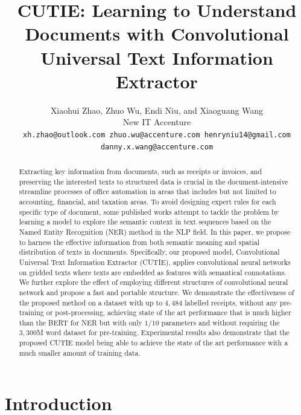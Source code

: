 \documentclass[10pt,twocolumn,letterpaper]{article}
\begin{document}
\title{CUTIE: Learning to Understand Documents with Convolutional Universal Text Information Extractor}

\author{
  Xiaohui Zhao, Zhuo Wu, Endi Niu, and Xiaoguang Wang \\
  New IT Accenture \\
{\tt\small xh.zhao@outlook.com zhuo.wu@accenture.com henryniu14@gmail.com danny.x.wang@accenture.com}
}

\maketitle

\begin{abstract}
   Extracting key information from documents, such as receipts or invoices, and preserving the interested texts to structured data is crucial in the document-intensive streamline processes of office automation in areas that includes but not limited to accounting, financial, and taxation areas. To avoid designing expert rules for each specific type of document, some published works attempt to tackle the problem by learning a model to explore the semantic context in text sequences based on the Named Entity Recognition (NER) method in the NLP field. In this paper, we propose to harness the effective information from both semantic meaning and spatial distribution of texts in documents. Specifically, our proposed model, Convolutional Universal Text Information Extractor (CUTIE), applies convolutional neural networks on gridded texts where texts are embedded as features with semantical connotations. We further explore the effect of employing different structures of convolutional neural network and propose a fast and portable structure. We demonstrate the effectiveness of the proposed method on a dataset with up to $4,484$ labelled receipts, without any pre-training or post-processing, achieving state of the art performance that is much higher than the BERT for NER but with only $1/10$ parameters and without requiring the $3,300$M word dataset for pre-training. Experimental results also demonstrate that the proposed CUTIE model being able to achieve the state of the art performance with a much smaller amount of training data.
\end{abstract}

\section{Introduction}
\end{document}
